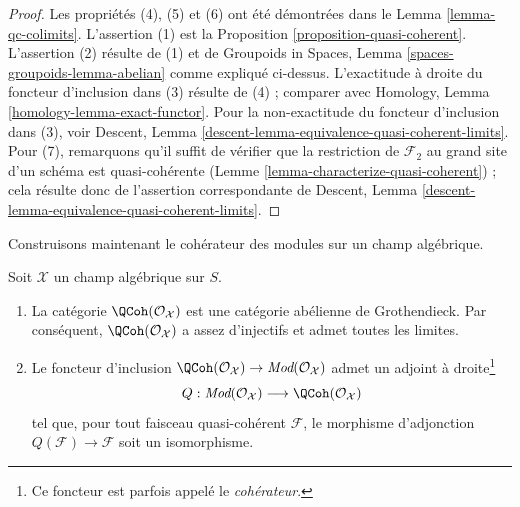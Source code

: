 \begin{proof}
Les propriétés (4), (5) et (6) ont été démontrées dans le
Lemma \ref{lemma-qc-colimits}.
L'assertion (1) est la
Proposition \ref{proposition-quasi-coherent}.
L'assertion (2) résulte de (1) et de
Groupoids in Spaces, Lemma \ref{spaces-groupoids-lemma-abelian}
comme expliqué ci-dessus. L'exactitude à droite du foncteur d'inclusion
dans (3) résulte de (4) ; comparer avec
Homology, Lemma \ref{homology-lemma-exact-functor}.
Pour la non-exactitude du foncteur d'inclusion dans (3), voir
Descent, Lemma \ref{descent-lemma-equivalence-quasi-coherent-limits}.
Pour (7), remarquons qu'il suffit de vérifier que la restriction
de $\mathcal{F}_2$ au grand site d'un schéma est quasi-cohérente
(Lemme \ref{lemma-characterize-quasi-coherent}) ;
cela résulte donc de l'assertion correspondante de
Descent, Lemma \ref{descent-lemma-equivalence-quasi-coherent-limits}.
\end{proof}

\noindent
Construisons maintenant le cohérateur des modules sur un champ algébrique.

\begin{proposition}
\label{proposition-coherator}
Soit $\mathcal{X}$ un champ algébrique sur $S$.
\begin{enumerate}
\item La catégorie $\QCoh(\mathcal{O}_\mathcal{X})$ est une catégorie
abélienne de Grothendieck. Par conséquent, $\QCoh(\mathcal{O}_\mathcal{X})$
a assez d'injectifs et admet toutes les limites.
\item Le foncteur d'inclusion
$\QCoh(\mathcal{O}_\mathcal{X}) \to
\textit{Mod}(\mathcal{O}_\mathcal{X})$ admet un adjoint à droite\footnote{Ce
foncteur est parfois appelé le {\it cohérateur}.}
$$
Q :
\textit{Mod}(\mathcal{O}_\mathcal{X})
\longrightarrow
\QCoh(\mathcal{O}_\mathcal{X})
$$
tel que, pour tout faisceau quasi-cohérent $\mathcal{F}$, le morphisme d'adjonction
$Q(\mathcal{F}) \to \mathcal{F}$ soit un isomorphisme.
\end{enumerate}
\end{proposition}

